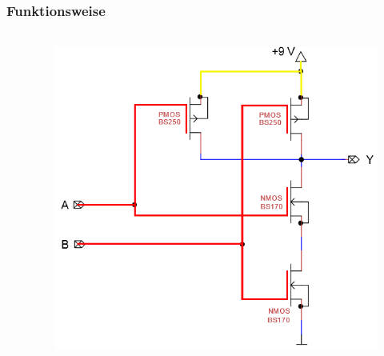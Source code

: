 \begin{frame}
    \frametitle{Funktionsweise}
    \framesubtitle{}
    \begin{columns}[c]
            \begin{center}
            \end{center}
            \begin{figure}[H]
            \begin{center}
                    \includegraphics[scale=0.5]{./img/schaltung/cmos_fun_11.png}
            \end{center}
            \end{figure}    
    \end{columns}
\end{frame}
